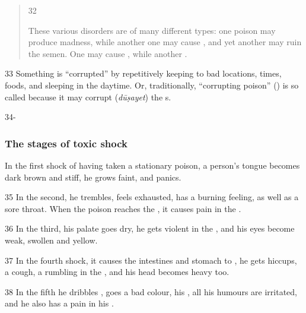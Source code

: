 \begin{translation}
\begin{verse}
        \item[32]
 
            These various disorders are of many different types: one poison may 
            produce
            madness, while another one may cause , and 
            yet
            another may ruin the semen. One may cause , while 
            another
            .
 
    \end{verse}

    
    \item[33]  
Something is “corrupted” by repetitively keeping to bad locations, times,
  foods, and sleeping in the daytime.  Or, traditionally, “corrupting poison” 
  () is so called because
    it may corrupt (\emph{dūṣayet}) the s.  
    
    
    
    
    
    \item[34-]
    \subsubsection{The stages of toxic shock}
    \label{stagesofshock}

    In the first shock of having taken a stationary poison, a person's tongue becomes dark brown and stiff, he grows faint, and panics.
    
    
    
    \item[35]
    In the second, he trembles, feels exhausted, has a burning feeling, as well as a
    sore throat.  When the poison reaches the , it causes
    pain in the .
    
    
    
    \item[36]
    In the third, his palate goes dry, he gets violent  in the 
    , and his eyes become weak, swollen and yellow.

    \item[37]
    In the fourth shock, it causes the intestines and stomach to
    , he gets hiccups, a cough,  a rumbling in the
    , and his head becomes heavy too.
    
     \item[38]
    In the fifth he dribbles , goes a bad colour,
    his ,  all his humours are irritated, and he
    also has a pain in his .
   

\end{translation}
